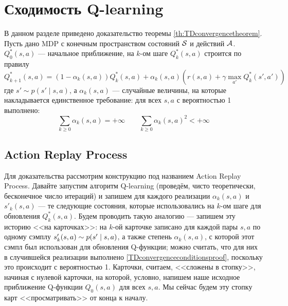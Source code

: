 \section{Сходимость Q-learning}\label{appendix:qlearning}

В данном разделе приведено доказательство теоремы \ref{th:TDconvergencetheorem}. Пусть дано MDP с конечным пространством состояний $\mathcal{S}$ и действий $\mathcal{A}$. $Q^*_0(s, a)$ --- начальное приближение, на $k$-ом шаге $Q^*_k(s, a)$ строится по правилу
\begin{equation}\label{Qlearningupdateproof}
Q^*_{k+1}(s, a) = (1 - \alpha_k(s, a))Q^*_k(s, a) + \alpha_k(s, a) \left( r(s, a) + \gamma \max_{a'} Q^*_k(s', a')\right)
\end{equation}
где $s' \sim p(s' \mid s, a)$, а $\alpha_k(s, a)$ --- случайные величины, на которые накладывается единственное требование: для всех $s, a$ с вероятностью 1 выполнено:
\begin{equation}\label{TDconvergenceconditionsproof}
\sum_{k \ge 0} \alpha_k(s, a) = +\infty \qquad \sum_{k \ge 0} \alpha_k(s, a)^2 < +\infty
\end{equation}

\subsection{Action Replay Process}

Для доказательства рассмотрим конструкцию под названием Action Replay Process. Давайте запустим алгоритм Q-learning (проведём, чисто теоретически, бесконечное число итераций) и запишем для каждого реализации $\alpha_k(s, a)$ и $s'_k(s, a)$ --- те следующие состояния, которые использовались на $k$-ом шаге для обновления $Q^*_k(s, a)$. Будем проводить такую аналогию --- запишем эту историю <<на карточках>>: на $k$-ой карточке записано для каждой пары $s, a$ по одному сэмплу $s'_k(s, a) \HM\sim p(s' \HM\mid s, a)$, а также степень $\alpha_k(s, a)$, с которой этот сэмпл был использован для обновления Q-функции; можно считать, что для них в случившейся реализации выполнено \eqref{TDconvergenceconditionsproof}, поскольку это происходит с вероятностью 1. Карточки, считаем, <<сложены в стопку>>, начиная с нулевой карточки, на которой, условно, напишем наше исходное приближение Q-функции $Q_0(s, a)$ для всех $s, a$. Мы сейчас будем эту стопку карт <<просматривать>> от конца к началу.

